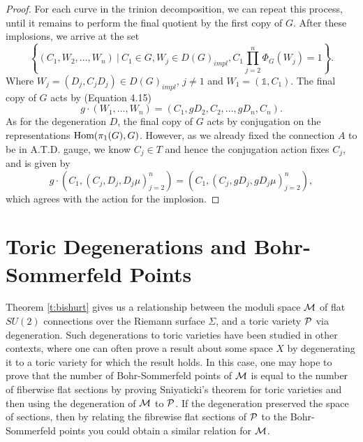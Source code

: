 \begin{proof}
		For each curve in the trinion decomposition, we can repeat this process, until it remains to perform the final quotient by the first copy of $G$. After these implosions, we arrive at the set
		\begin{equation}
			\left\{
			(C_1,W_2,...,W_n) ~|~ C_1 \in G, W_j \in D(G)_{impl}, C_1\prod_{j=2}^{n}\Phi_G(W_j) = 1	
			\right\}. 
		\end{equation}
		Where $W_j = (D_j,C_jD_j) \in D(G)_{impl}$, $j\neq 1$ and $W_1 = (\mathds{1},C_1)$. The final copy of $G$ acts by (Equation 4.15)
		\begin{equation}
			g\cdot(W_1,...,W_{n}) = (C_1,gD_2,C_2,...,gD_n, C_n). 
		\end{equation}
		As for the degeneration $D$, the final copy of $G$ acts by conjugation on the representations $\text{Hom}(\pi_1(G),G)$. However, as we already fixed the connection $A$ to be in A.T.D. gauge, we know $C_j \in T$ and hence the conjugation action fixes $C_j$, and is given by
		\begin{equation}
			g \cdot (C_1,(C_j,D_j, D_j\mu)_{j=2}^n) = (C_1, (C_j, gD_j, gD_j\mu)_{j=2}^n),
		\end{equation}
		which agrees with the action for the implosion. 
	\end{proof}
	
	\section{Toric Degenerations and Bohr-Sommerfeld Points}
	
	Theorem \ref{t:bishurt} gives us a relationship between the moduli space $\mathcal{M}$ of flat $SU(2)$ connections over the Riemann surface $\Sigma$, and a toric variety $\mathcal{P}$ via degeneration. Such degenerations to toric varieties have been studied in other contexts, where one can often prove a result about some space $X$ by degenerating it to a toric variety for which the result holds. In this case, one may hope to prove that the number of Bohr-Sommerfeld points of $\mathcal{M}$ is equal to the number of fiberwise flat sections by proving Sniyaticki's theorem for toric varieties and then using the degeneration of $\mathcal{M}$ to $\mathcal{P}$. If the degeneration preserved the space of sections, then by relating the fibrewise flat sections of $\mathcal{P}$ to the Bohr-Sommerfeld points you could obtain a similar relation for $\mathcal{M}$. 
	
